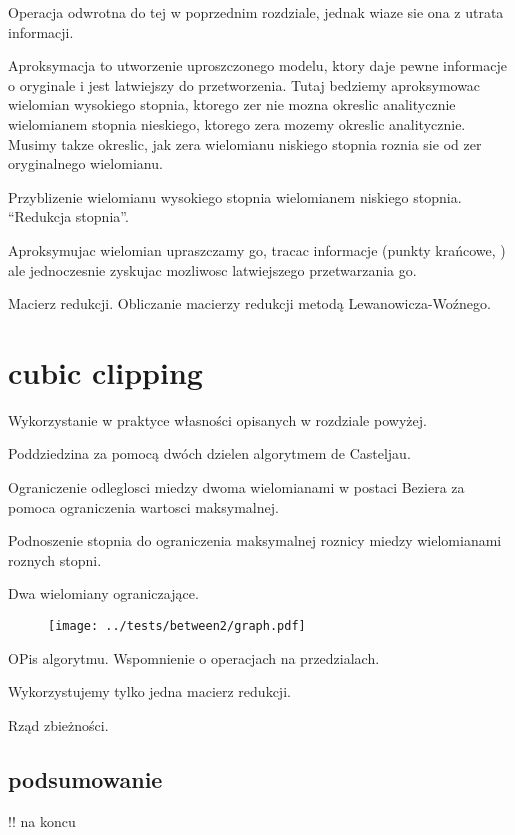 \documentclass[11pt,a4paper,oneside]{report}
\begin{document}
Operacja odwrotna do tej w poprzednim rozdziale, jednak wiaze sie ona z utrata informacji.

Aproksymacja to utworzenie uproszczonego modelu, ktory daje pewne informacje o oryginale i jest latwiejszy do przetworzenia. Tutaj bedziemy aproksymowac wielomian wysokiego stopnia, ktorego zer nie mozna okreslic analitycznie wielomianem stopnia nieskiego, ktorego zera mozemy okreslic analitycznie. Musimy takze okreslic, jak zera wielomianu niskiego stopnia roznia sie od zer oryginalnego wielomianu.

Przyblizenie wielomianu wysokiego stopnia wielomianem niskiego stopnia. ``Redukcja stopnia''. 

Aproksymujac wielomian upraszczamy go, tracac informacje (punkty krańcowe, ) ale jednoczesnie zyskujac mozliwosc latwiejszego przetwarzania go.

Macierz redukcji. Obliczanie macierzy redukcji metodą Lewanowicza-Woźnego.

\section{cubic clipping}

Wykorzystanie w praktyce własności opisanych w rozdziale powyżej.

Poddziedzina za pomocą dwóch dzielen algorytmem de Casteljau.

Ograniczenie odleglosci miedzy dwoma wielomianami w postaci Beziera za pomoca ograniczenia wartosci maksymalnej.

Podnoszenie stopnia do ograniczenia maksymalnej roznicy miedzy wielomianami roznych stopni.

Dwa wielomiany ograniczające.

\begin{center}
  \begin{figure}
    \texttt{[image: ../tests/between2/graph.pdf]}
  \end{figure}
\end{center}



OPis algorytmu. Wspomnienie o operacjach na przedzialach.

Wykorzystujemy tylko jedna macierz redukcji.

Rząd zbieżności.

\subsection{podsumowanie}

!! na koncu
\end{document}

